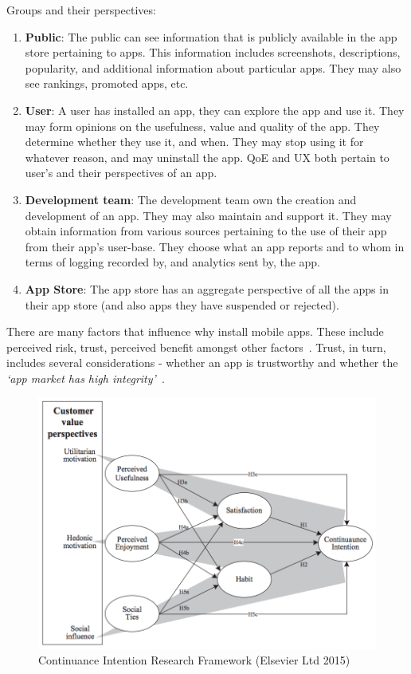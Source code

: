 Groups and their perspectives:
\begin{enumerate}
    \item \textbf{Public}: The public can see information that is publicly available in the app store pertaining to apps. This information includes screenshots, descriptions, popularity, and additional information about particular apps. They may also see rankings, promoted apps, etc.
    \item \textbf{User}: A user has installed an app, they can explore the app and use it. They may form opinions on the usefulness, value and quality of the app. They determine whether they use it, and when. They may stop using it for whatever reason, and may uninstall the app. QoE and UX both pertain to user's and their perspectives of an app.
    \item \textbf{Development team}: The development team own the creation and development of an app. They may also maintain and support it. They may obtain information from various sources pertaining to the use of their app from their app's user-base. They choose what an app reports and to whom in terms of logging recorded by, and analytics sent by, the app.
    \item \textbf{App Store}: The app store has an aggregate perspective of all the apps in their app store (and also apps they have suspended or rejected).
\end{enumerate}

There are many factors that influence why install mobile apps. These include perceived risk, trust, perceived benefit amongst other factors~\cite{harris2016identifying}. Trust, in turn, includes several considerations - whether an app is trustworthy and whether the \emph{`app market has high integrity'}~\cite{harris2016identifying}.

\begin{figure}[ht]
    \centering
    \includegraphics[width=13cm]{images/Consumer_Value_Perspectives_screenshot.png}
    \caption{Continuance Intention Research Framework (\textcopyright Elsevier Ltd 2015)}
    \label{fig:consumer_value_perspectives_elsevier}
\end{figure}

